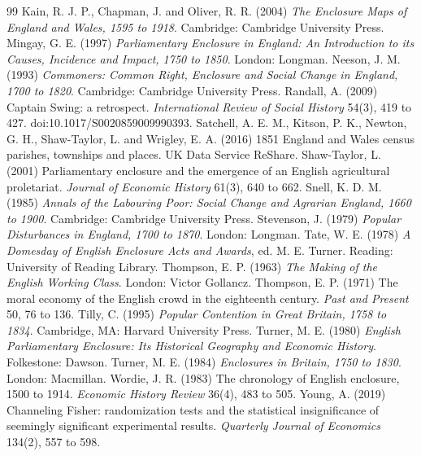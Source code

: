 \documentclass[11pt,a4paper]{article}
\begin{document}
\begin{thebibliography}{99}
 Kain, R. J. P., Chapman, J. and Oliver, R. R. (2004) \textit{The Enclosure Maps of England and Wales, 1595 to 1918}. Cambridge: Cambridge University Press.
 Mingay, G. E. (1997) \textit{Parliamentary Enclosure in England: An Introduction to its Causes, Incidence and Impact, 1750 to 1850}. London: Longman.
 Neeson, J. M. (1993) \textit{Commoners: Common Right, Enclosure and Social Change in England, 1700 to 1820}. Cambridge: Cambridge University Press.
 Randall, A. (2009) Captain Swing: a retrospect. \textit{International Review of Social History} 54(3), 419 to 427. doi:10.1017/S0020859009990393.
 Satchell, A. E. M., Kitson, P. K., Newton, G. H., Shaw-Taylor, L. and Wrigley, E. A. (2016) 1851 England and Wales census parishes, townships and places. UK Data Service ReShare.
 Shaw-Taylor, L. (2001) Parliamentary enclosure and the emergence of an English agricultural proletariat. \textit{Journal of Economic History} 61(3), 640 to 662.
 Snell, K. D. M. (1985) \textit{Annals of the Labouring Poor: Social Change and Agrarian England, 1660 to 1900}. Cambridge: Cambridge University Press.
 Stevenson, J. (1979) \textit{Popular Disturbances in England, 1700 to 1870}. London: Longman.
 Tate, W. E. (1978) \textit{A Domesday of English Enclosure Acts and Awards}, ed. M. E. Turner. Reading: University of Reading Library.
 Thompson, E. P. (1963) \textit{The Making of the English Working Class}. London: Victor Gollancz.
 Thompson, E. P. (1971) The moral economy of the English crowd in the eighteenth century. \textit{Past and Present} 50, 76 to 136.
 Tilly, C. (1995) \textit{Popular Contention in Great Britain, 1758 to 1834}. Cambridge, MA: Harvard University Press.
 Turner, M. E. (1980) \textit{English Parliamentary Enclosure: Its Historical Geography and Economic History}. Folkestone: Dawson.
 Turner, M. E. (1984) \textit{Enclosures in Britain, 1750 to 1830}. London: Macmillan.
 Wordie, J. R. (1983) The chronology of English enclosure, 1500 to 1914. \textit{Economic History Review} 36(4), 483 to 505.
 Young, A. (2019) Channeling Fisher: randomization tests and the statistical insignificance of seemingly significant experimental results. \textit{Quarterly Journal of Economics} 134(2), 557 to 598.
\end{thebibliography}
\end{document}
